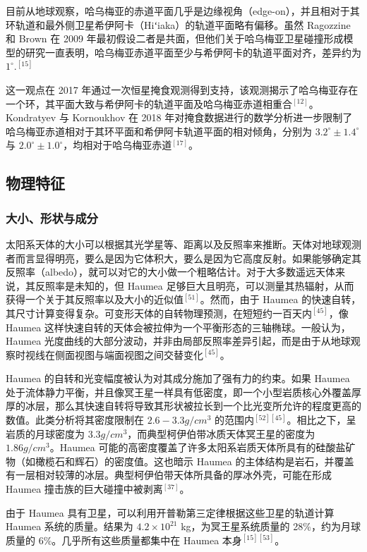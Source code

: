 目前从地球观察，哈乌梅亚的赤道平面几乎是边缘视角（edge-on），并且相对于其环轨道和最外侧卫星希伊阿卡（Hiʻiaka）的轨道平面略有偏移。虽然 Ragozzine 和 Brown 在 2009 年最初假设二者是共面，但他们关于哈乌梅亚卫星碰撞形成模型的研究一直表明，哈乌梅亚赤道平面至少与希伊阿卡的轨道平面对齐，差异约为 $1^\circ$.$^{[15]}$

这一观点在 2017 年通过一次恒星掩食观测得到支持，该观测揭示了哈乌梅亚存在一个环，其平面大致与希伊阿卡的轨道平面及哈乌梅亚赤道相重合$^{[12]}$。Kondratyev 与 Kornoukhov 在 2018 年对掩食数据进行的数学分析进一步限制了哈乌梅亚赤道相对于其环平面和希伊阿卡轨道平面的相对倾角，分别为 $3.2^\circ \pm 1.4^\circ$ 与 $2.0^\circ \pm 1.0^\circ$，均相对于哈乌梅亚赤道$^{[17]}$。
\subsection{物理特征}
\subsubsection{大小、形状与成分}
太阳系天体的大小可以根据其光学星等、距离以及反照率来推断。天体对地球观测者而言显得明亮，要么是因为它体积大，要么是因为它高度反射。如果能够确定其反照率（albedo），就可以对它的大小做一个粗略估计。对于大多数遥远天体来说，其反照率是未知的，但 Haumea 足够巨大且明亮，可以测量其热辐射，从而获得一个关于其反照率以及大小的近似值$^{[51]}$。然而，由于 Haumea 的快速自转，其尺寸计算变得复杂。可变形天体的自转物理预测，在短短约一百天内$^{[45]}$，像 Haumea 这样快速自转的天体会被拉伸为一个平衡形态的三轴椭球。一般认为，Haumea 光度曲线的大部分波动，并非由局部反照率差异引起，而是由于从地球观察时视线在侧面视图与端面视图之间交替变化$^{[45]}$。

Haumea 的自转和光变幅度被认为对其成分施加了强有力的约束。如果 Haumea 处于流体静力平衡，并且像冥王星一样具有低密度，即一个小型岩质核心外覆盖厚厚的冰层，那么其快速自转将导致其形状被拉长到一个比光变所允许的程度更高的数值。此类分析将其密度限制在 $2.6-3.3 g/cm^3$ 的范围内$^{[52][45]}$。相比之下，呈岩质的月球密度为 $3.3 g/cm^3$，而典型柯伊伯带冰质天体冥王星的密度为 $1.86 g/cm^3$。Haumea 可能的高密度覆盖了许多太阳系岩质天体所具有的硅酸盐矿物（如橄榄石和辉石）的密度值。这也暗示 Haumea 的主体结构是岩石，并覆盖有一层相对较薄的冰层。典型柯伊伯带天体所具备的厚冰外壳，可能在形成 Haumea 撞击族的巨大碰撞中被剥离$^{[37]}$。

由于 Haumea 具有卫星，可以利用开普勒第三定律根据这些卫星的轨道计算 Haumea 系统的质量。结果为 $4.2 \times 10^{21}$ kg，为冥王星系统质量的 28\%，约为月球质量的 6\%。几乎所有这些质量都集中在 Haumea 本身$^{[15][53]}$。

